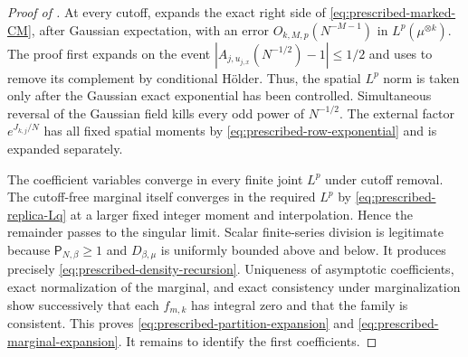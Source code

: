 \documentclass[11pt,reqno]{amsart}
\numberwithin{equation}{section}
\theoremstyle{plain}
\theoremstyle{definition}
\newcommand{\be}{\beta}
\begin{document}
\begin{proof}[Proof of ]
At every cutoff,  expands the exact right side of \eqref{eq:prescribed-marked-CM}, after Gaussian expectation, with an error $O_{k,M,p}(N^{-M-1})$ in $L^p(\mu^{\otimes k})$.  The proof first expands on the event $|A_{j,u_{j,x}}(N^{-1/2})-1|\leq1/2$ and uses  to remove its complement by conditional H\"older.  Thus, the spatial $L^p$ norm is taken only after the Gaussian exact exponential has been controlled.  Simultaneous reversal of the Gaussian field kills every odd power of $N^{-1/2}$.  The external factor $e^{J_{k,j}/N}$ has all fixed spatial moments by \eqref{eq:prescribed-row-exponential} and is expanded separately.

The coefficient variables converge in every finite joint $L^p$ under cutoff removal.  The cutoff-free marginal itself converges in the required $L^p$ by \eqref{eq:prescribed-replica-Lq} at a larger fixed integer moment and interpolation.  Hence the remainder passes to the singular limit.  Scalar finite-series division is legitimate because $\mathsf P_{N,\be}\geq1$ and $D_{\be,\mu}$ is uniformly bounded above and below.  It produces precisely \eqref{eq:prescribed-density-recursion}.  Uniqueness of asymptotic coefficients, exact normalization of the marginal, and exact consistency under marginalization show successively that each $f_{m,k}$ has integral zero and that the family is consistent.  This proves \eqref{eq:prescribed-partition-expansion} and \eqref{eq:prescribed-marginal-expansion}.  It remains to identify the first coefficients.


\end{proof}
\end{document}
